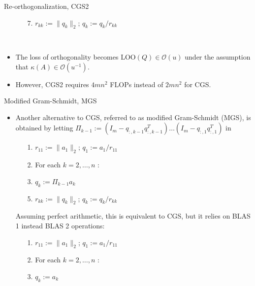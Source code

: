 \documentclass[t,usepdftitle=false]{beamer}
\begin{document}
\begin{frame}{Re-orthogonalization, CGS2}
\begin{itemize}
\begin{minipage}[lt]{0.43\textwidth}
\begin{itemize}
\item[7.]\hspace{.4cm}$r_{kk}:=\|q_k\|_2$; $q_{k}:=q_k/r_{kk}$
\end{itemize}
\vspace{.2cm}
\end{minipage}\vspace{.08cm}\\
\item The loss of orthogonality becomes $\mathrm{LOO}(Q)\in\mathcal{O}(u)$ under the assumption that $\kappa(A)\in\mathcal{O}(u^{-1})$.
\item However, CGS2 requires $4mn^2$ FLOPs instead of $2mn^2$ for CGS.
\end{itemize}
\end{frame}

\begin{frame}{Modified Gram-Schmidt, MGS}
\begin{itemize}
\item Another alternative to CGS, referred to as modified Gram-Schmidt (MGS), is obtained by letting $\Pi_{k-1}:=(I_m-q_{:,k-1}q_{:,k-1}^T)\dots(I_m-q_{:,1}q_{:,1}^T)$ in\vspace{.2cm}
\begin{itemize}
\item[1.] $r_{11}:=\|a_1\|_2$; $q_1:=a_1/r_{11}$ \vspace{.1cm}
\item[2.] For each $k=2,\dots,n$ :\vspace{.1cm}
\item[3.]\hspace{.4cm}$q_k:=\Pi_{k-1}a_k$\vspace{.1cm}
\item[5.]\hspace{.4cm}$r_{kk}:=\|q_k\|_2$; $q_{k}:=q_k/r_{kk}$
\end{itemize}\vspace{.2cm}
Assuming perfect arithmetic, this is equivalent to CGS, but it relies on BLAS 1 instead BLAS 2 operations:\vspace{.2cm}
\begin{itemize}
\item[1.] $r_{11}:=\|a_1\|_2$; $q_1:=a_1/r_{11}$ \vspace{.1cm}
\item[2.] For each $k=2,\dots,n$ :\vspace{.1cm}
\item[3.]\hspace{.4cm}$q_k:=a_k$\vspace{.1cm}

\end{itemize}
\end{itemize}
\end{frame}
\end{document}
